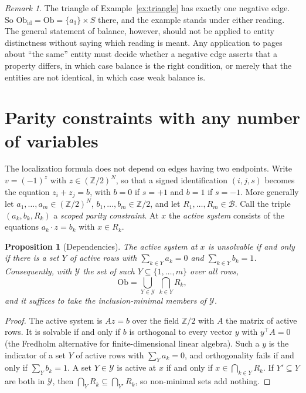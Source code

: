 \documentclass[11pt]{article}
\theoremstyle{plain}
\newtheorem{proposition}[theorem]{Proposition}
\theoremstyle{definition}
\theoremstyle{remark}
\newtheorem{remark}[theorem]{Remark}
\newcommand{\Ob}{\mathrm{Ob}}
\begin{document}
\begin{remark}
The triangle of Example~\ref{ex:triangle} has exactly one negative edge. So $\Ob_{\mathrm{id}}=\Ob=\{a_3\}\times S$ there, and the example stands under either reading. The general statement of balance, however, should not be applied to entity distinctness without saying which reading is meant. Any application to pages about ``the same'' entity must decide whether a negative edge asserts that a property differs, in which case balance is the right condition, or merely that the entities are not identical, in which case weak balance is.
\end{remark}

\section{Parity constraints with any number of variables}\label{sec:xor}

The localization formula does not depend on edges having two endpoints. Write $v=(-1)^z$ with $z\in(\mathbb Z/2)^N$, so that a signed identification $(i,j,s)$ becomes the equation $z_i+z_j=b$, with $b=0$ if $s=+1$ and $b=1$ if $s=-1$. More generally let $a_1,\dots,a_m\in(\mathbb Z/2)^N$, $b_1,\dots,b_m\in\mathbb Z/2$, and let $R_1,\dots,R_m\in\mathcal B$. Call the triple $(a_k,b_k,R_k)$ a \emph{scoped parity constraint}. At $x$ the \emph{active system} consists of the equations $a_k\cdot z=b_k$ with $x\in R_k$.

\begin{proposition}[Dependencies]\label{prop:xor}
The active system at $x$ is unsolvable if and only if there is a set $Y$ of active rows with $\sum_{k\in Y}a_k=0$ and $\sum_{k\in Y}b_k=1$. Consequently, with $\mathcal Y$ the set of such $Y\subseteq\{1,\dots,m\}$ over all rows,
\[
\Ob=\bigcup_{Y\in\mathcal Y}\ \bigcap_{k\in Y}R_k ,
\]
and it suffices to take the inclusion-minimal members of $\mathcal Y$.
\end{proposition}

\begin{proof}
The active system is $Az=b$ over the field $\mathbb Z/2$ with $A$ the matrix of active rows. It is solvable if and only if $b$ is orthogonal to every vector $y$ with $y^{\top}A=0$ (the Fredholm alternative for finite-dimensional linear algebra). Such a $y$ is the indicator of a set $Y$ of active rows with $\sum_{Y}a_k=0$, and orthogonality fails if and only if $\sum_{Y}b_k=1$. A set $Y\in\mathcal Y$ is active at $x$ if and only if $x\in\bigcap_{k\in Y}R_k$. If $Y'\subseteq Y$ are both in $\mathcal Y$, then $\bigcap_{Y}R_k\subseteq\bigcap_{Y'}R_k$, so non-minimal sets add nothing.
\end{proof}
\end{document}
